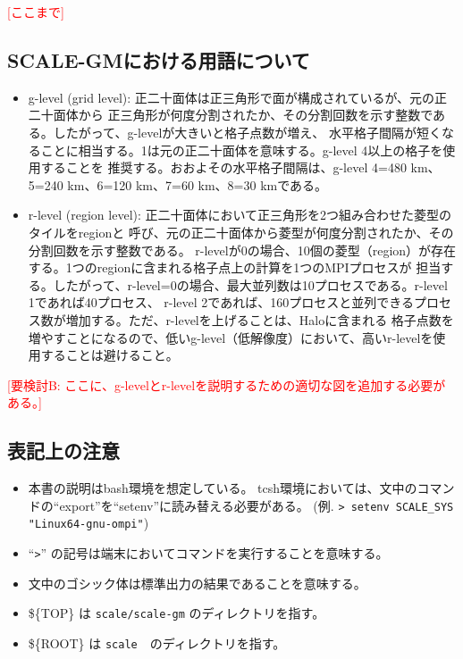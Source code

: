 \textcolor{red}{[ここまで]}

\subsection{SCALE-GMにおける用語について}

 \begin{itemize}
   \item g-level (grid level): 正二十面体は正三角形で面が構成されているが、元の正二十面体から
正三角形が何度分割されたか、その分割回数を示す整数である。したがって、g-levelが大きいと格子点数が増え、
水平格子間隔が短くなることに相当する。1は元の正二十面体を意味する。g-level 4以上の格子を使用することを
推奨する。おおよその水平格子間隔は、g-level 4=480 km、5=240 km、6=120 km、7=60 km、8=30 kmである。
   \item r-level (region level): 正二十面体において正三角形を2つ組み合わせた菱型のタイルをregionと
呼び、元の正二十面体から菱型が何度分割されたか、その分割回数を示す整数である。
r-levelが0の場合、10個の菱型（region）が存在する。1つのregionに含まれる格子点上の計算を1つのMPIプロセスが
担当する。したがって、r-level=0の場合、最大並列数は10プロセスである。r-level 1であれば40プロセス、
r-level 2であれば、160プロセスと並列できるプロセス数が増加する。ただ、r-levelを上げることは、Haloに含まれる
格子点数を増やすことになるので、低いg-level（低解像度）において、高いr-levelを使用することは避けること。
 \end{itemize}

\textcolor{red}{[要検討B: ここに、g-levelとr-levelを説明するための適切な図を追加する必要がある。]}


\subsection{表記上の注意}
 \begin{itemize}
   \item 本書の説明はbash環境を想定している。
         tcsh環境においては、文中のコマンドの``export''を``setenv''に読み替える必要がある。
         (例. \verb|> setenv SCALE_SYS "Linux64-gnu-ompi"|)
   \item ``\verb|>|'' の記号は端末においてコマンドを実行することを意味する。
   \item 文中のゴシック体は標準出力の結果であることを意味する。
   \item \$\{TOP\} は   \verb|scale/scale-gm| のディレクトリを指す。
   \item \$\{ROOT\} は  \verb|scale|　のディレクトリを指す。
 \end{itemize}

